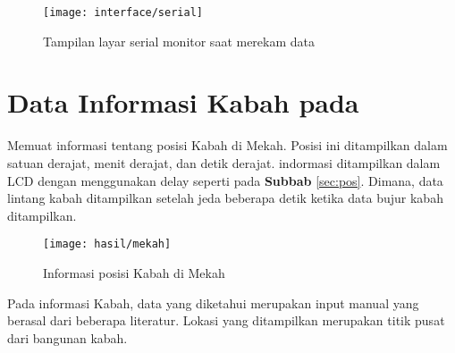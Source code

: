 \begin{figure}
\centering
\texttt{[image: interface/serial]}
\caption{Tampilan layar serial monitor saat merekam data}
\end{figure}

\section{Data Informasi Kabah pada \Alat}
Memuat informasi tentang posisi Kabah di Mekah. Posisi ini ditampilkan dalam satuan derajat, menit derajat, dan detik derajat. indormasi ditampilkan dalam LCD dengan menggunakan delay seperti pada \textbf{Subbab} \ref{sec:pos}. Dimana, data lintang kabah ditampilkan setelah jeda beberapa detik ketika data bujur kabah ditampilkan.
\begin{figure}
\centering
\texttt{[image: hasil/mekah]}
\caption{Informasi posisi Kabah di Mekah}
\end{figure}
Pada informasi Kabah, data yang diketahui merupakan input manual yang berasal dari beberapa literatur. Lokasi yang ditampilkan merupakan titik pusat dari bangunan kabah.  
